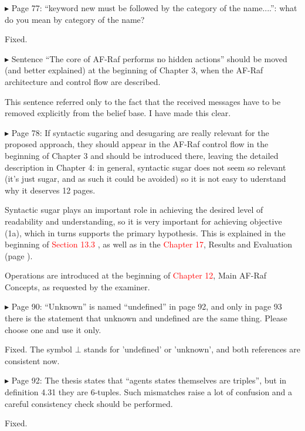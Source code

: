 \documentclass{article}
\newcommand*\R[1]{\textcolor{red}{#1}} %
\newenvironment{them}%
  {\bigskip\noindent\begingroup\color{blue}$\blacktriangleright$\enspace}%
  {\endgroup\par}
\begin{document}
\begin{them}
Page 77:
``keyword new must be followed by the category of the name....'': what do you
mean by category of the name?
\end{them}
Fixed.

\begin{them}
Sentence ``The core of AF-Raf performs no hidden actions'' should be moved (and
better explained) at the beginning of Chapter 3, when the AF-Raf architecture
and control flow are described.
\end{them}
This sentence referred only to the fact that the received messages have to be
removed explicitly from the belief base. I have made this clear.

\begin{them}
Page 78:
If syntactic sugaring and desugaring are really relevant for the proposed
approach, they should appear in the AF-Raf control flow in the beginning of
Chapter 3 and should be introduced there, leaving the detailed description in
Chapter 4: in general, syntactic sugar does not seem so relevant (it's just
sugar, and as such it could be avoided) so it is not easy to uderstand why it
deserves 12 pages.
\end{them}

Syntactic sugar plays an important role in achieving the desired level of
readability and understanding, so it is very important for achieving objective
(1a), which in turns supports the primary hypothesis. This is explained in the
beginning of \R{Section 13.3} , as well as in the \R{Chapter 17}, Results and
Evaluation (page ).

Operations are introduced at the beginning of \R{Chapter 12}, Main AF-Raf
Concepts, as requested by the examiner.

\begin{them}
Page 90:
``Unknown'' is named ``undefined'' in page 92, and only in page 93 there is the
statement that unknown and undefined are the same thing. Please choose one and
use it only.
\end{them}
Fixed. The symbol $\bot$ stands for 'undefined' or 'unknown', and both
references are consistent now. 

\begin{them}
Page 92:
The thesis states that ``agents states themselves are triples'', but in
definition 4.31 they are 6-tuples.  Such mismatches raise a lot of confusion
and a careful consistency check should be performed.
\end{them}
Fixed.
\end{document}
